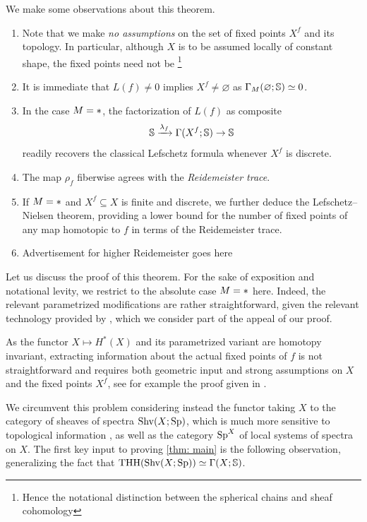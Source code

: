 \begin{rmk}
  We make some observations about this theorem. 
  \begin{enumerate}
    \item Note that we make \emph{no assumptions} on the set of fixed points $X^f$ and its topology.
      In particular, although $X$ is to be assumed locally of constant shape,
      the fixed points need not be \footnote{Hence the notational
      distinction between the spherical chains and sheaf cohomology}
    \item It is immediate that $L(f)\neq 0$ implies $X^f\neq \varnothing$ as
      $\Gamma_M(\varnothing; \mathbb{S})\simeq 0$. 
    \item In the case $M=\ast$, the factorization of $L(f)$ as composite 
      \[ \mathbb{S} \xrightarrow{\lambda_f} \Gamma(X^f;\mathbb{S}) \to \mathbb{S}\]
      readily recovers the classical Lefschetz formula whenever $X^f$ is discrete.
    \item The map $\rho_f$ fiberwise agrees with the \emph{Reidemeister trace}. 
    \item If $M=\ast$ and $X^f\subseteq X$ is finite and discrete, we further deduce the 
      Lefschetz--Nielsen theorem, providing a lower bound for the number of fixed points
      of any map homotopic to $f$ in terms of the Reidemeister trace.
    \item Advertisement for higher Reidemeister goes here 
  \end{enumerate}
\end{rmk}

Let us discuss the proof of this theorem. For the sake of exposition and notational levity,
we restrict to the absolute case $M=\ast$ here. Indeed, the relevant parametrized modifications
are rather straightforward, given the relevant technology provided by ,
which we consider part of the appeal of our proof.

As the functor $X\mapsto H^*(X)$ and its parametrized variant are homotopy invariant,
extracting information about the actual fixed points of $f$ is not straightforward
and requires both geometric input and strong assumptions on $X$ and the fixed points $X^f$,
see for example the proof given in \cite{Dold_Puppe1980}. 

We circumvent this problem considering instead the functor taking $X$ to 
the category of sheaves of spectra $\operatorname{Shv}(X;\operatorname{Sp})$, which is 
much more sensitive to topological information , as well as the
category $\operatorname{Sp}^X$ of local systems of spectra on $X$.
The first key input to proving \cref{thm: main} is the following observation, 
generalizing the fact that $\mathrm{THH}(\operatorname{Shv}(X;\operatorname{Sp})) \simeq \Gamma(X;\mathbb{S})$.

